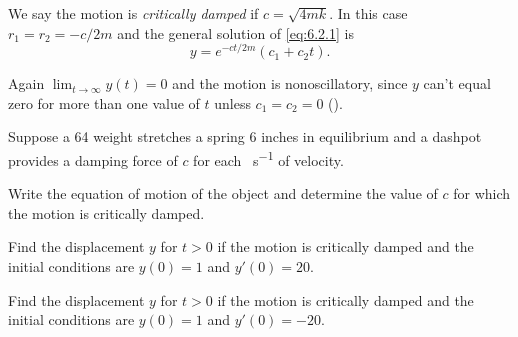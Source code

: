 We say the motion is \emph{\color{blue}critically damped} if $c=\sqrt{4mk}$. In
this case $r_1=r_2=-c/2m$ and the general solution of \eqref{eq:6.2.1} is
\[
y=e^{-ct/2m}(c_1+c_2t).
\]

Again $\lim_{t\to\infty}y(t)=0$ and the motion is nonoscillatory,
since $y$ can't equal zero for more than one value of $t$ unless
$c_1=c_2=0$ ().

\begin{example}\label{example:6.2.1}
Suppose a \qty{64}{\pound} weight stretches a spring 6 inches in equilibrium
and a dashpot provides a damping force of $c$ \unit{\pound} for each \unit{\foot\per\second} of
velocity.
\begin{alist}
\item %
 Write the equation of motion of the object and determine the value of
$c$ for which the motion is critically damped.
\item %
 Find the displacement $y$ for $t>0$ if the motion is critically damped
and the initial conditions are $y(0)=1$ and $y'(0)=20$.
\item %
 Find the displacement $y$ for $t>0$ if the motion is critically damped
and the initial conditions are $y(0)=1$ and $y'(0)=-20$.
\end{alist}
\end{example}

